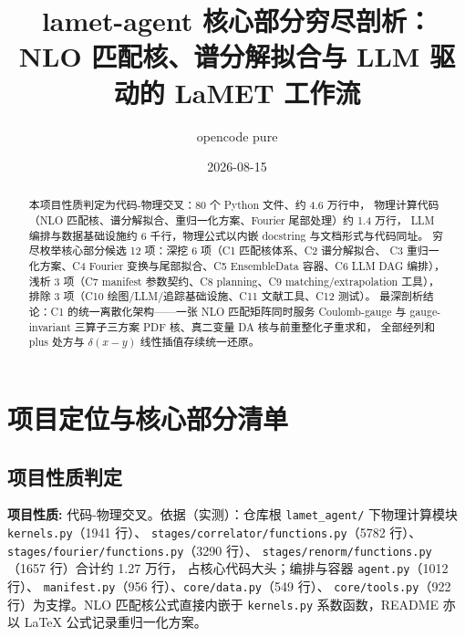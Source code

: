 \documentclass[UTF8]{ctexart}
\title{lamet-agent 核心部分穷尽剖析：\\ NLO 匹配核、谱分解拟合与 LLM 驱动的 LaMET 工作流}
\author{opencode pure}
\date{2026-08-15}
\begin{document}
\maketitle

\begin{abstract}
本项目性质判定为\textcolor{phys}{代码-物理交叉}：80 个 Python 文件、约 4.6 万行中，
物理计算代码（NLO 匹配核、谱分解拟合、重归一化方案、Fourier 尾部处理）约 1.4 万行，
LLM 编排与数据基础设施约 6 千行，物理公式以内嵌 docstring 与文档形式与代码同址。
穷尽枚举核心部分候选 12 项：\textcolor{phys}{深挖 6 项}（C1 匹配核体系、C2 谱分解拟合、
C3 重归一化方案、C4 Fourier 变换与尾部拟合、C5 EnsembleData 容器、C6 LLM DAG 编排），
\textcolor{phys}{浅析 3 项}（C7 manifest 参数契约、C8 planning、C9 matching/extrapolation 工具），
\textcolor{phys}{排除 3 项}（C10 绘图/LLM/追踪基础设施、C11 文献工具、C12 测试）。
最深剖析结论：C1 的\textcolor{algo}{统一离散化架构}——一张 NLO 匹配矩阵同时服务
Coulomb-gauge 与 gauge-invariant 三算子三方案 PDF 核、真二变量 DA 核与前重整化子重求和，
全部经列和 plus 处方与 $\delta(x-y)$ 线性插值存续统一还原。
\end{abstract}

\tableofcontents

\section{项目定位与核心部分清单}
\subsection{项目性质判定}
\begin{keybox}
\textbf{项目性质:} \textcolor{phys}{代码-物理交叉}。依据（实测）：仓库根
\texttt{\nolinkurl{lamet_agent/}} 下物理计算模块 \texttt{\nolinkurl{kernels.py}}（1941 行）、
\texttt{\nolinkurl{stages/correlator/functions.py}}（5782 行）、
\texttt{\nolinkurl{stages/fourier/functions.py}}（3290 行）、
\texttt{\nolinkurl{stages/renorm/functions.py}}（1657 行）合计约 1.27 万行，
占核心代码大头；编排与容器 \texttt{\nolinkurl{agent.py}}（1012 行）、
\texttt{\nolinkurl{manifest.py}}（956 行）、\texttt{\nolinkurl{core/data.py}}（549 行）、
\texttt{\nolinkurl{core/tools.py}}（922 行）为支撑。NLO 匹配核公式直接内嵌于
\texttt{\nolinkurl{kernels.py}} 系数函数，README 亦以 LaTeX 公式记录重归一化方案。
\end{keybox}
\end{document}
